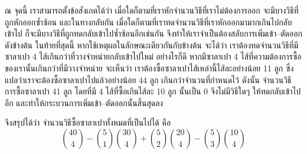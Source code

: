 \begin{example}
ณ จุดนี้ เราสามารถตั้งข้อสังเกตได้ว่า เมื่อใดก็ตามที่เราหักจำนวนวิธีที่เราไม่ต้องการออก จะมีบางวิธีที่ถูกหักออกซ้ำซ้อน และในทางกลับกัน เมื่อใดก็ตามที่เราทดจำนวนวิธีที่เราหักออกมามากเกินไปกลับเข้าไป ก็จะมีบางวิธีที่ถูกทดกลับเข้าไปซ้ำซ้อนอีกเช่นกัน จึงทำให้เราจำเป็นต้องสลับการเพิ่มเข้า--ตัดออกดังข้างต้น \enskip ในท้ายที่สุดนี้ หากใช้เหตุผลในลักษณะเดียวกันกับข้างต้น จะได้ว่า เราต้องทดจำนวนวิธีที่มีซาลาเปา 4 ไส้เกินกว่าที่วางจำหน่ายกลับเข้าไปใหม่ \enskip อย่างไรก็ดี หากมีซาลาเปา 4 ไส้ที่ความต้องการซื้อของเรานั้นเกินกว่าที่มีวางจำหน่าย จะเห็นว่า เราต้องซื้อซาลาเปาไส้เหล่านี้ไส้ละอย่างน้อย 11 ลูก ซึ่งแปลว่าเราจะต้องซื้อซาลาเปาไปแล้วอย่างน้อย 44 ลูก เกินกว่าจำนวนที่กำหนดไว้ \enskip ดังนั้น จำนวนวิธีการซื้อซาลาเปา 41 ลูก โดยที่มี 4 ไส้ที่ซื้อเกินไส้ละ 10 ลูก นั้นเป็น 0 จึงไม่มีวิธีใดๆ ให้ทดกลับเข้าไปอีก และทำให้กระบวนการเพิ่มเข้า--ตัดออกนั้นสิ้นสุดลง

จึงสรุปได้ว่า จำนวนวิธีซื้อซาลาเปาทั้งหมดที่เป็นไปได้ คือ
\[\binom{40}{4}-\binom{5}{1}\binom{30}{4}+\binom{5}{2}\binom{20}{4}-\binom{5}{3}\binom{10}{4}\]
\end{example}
